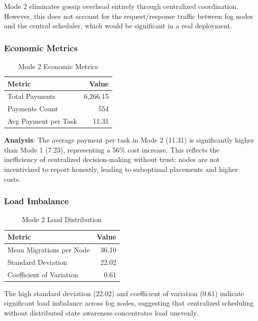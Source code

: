 \documentclass[12pt,a4paper]{article}
\begin{document}
Mode 2 eliminates gossip overhead entirely through centralized coordination. However, this does not account for the request/response traffic between fog nodes and the central scheduler, which would be significant in a real deployment.

\subsubsection{Economic Metrics}

\begin{table}[h]
\centering
\begin{tabular}{@{}lr@{}}
\toprule
\textbf{Metric} & \textbf{Value} \\ \midrule
Total Payments & 6,266.15 \\
Payments Count & 554 \\
Avg Payment per Task & 11.31 \\ \bottomrule
\end{tabular}
\caption{Mode 2 Economic Metrics}
\label{tab:mode2-economic}
\end{table}

\textbf{Analysis}: The average payment per task in Mode 2 (11.31) is significantly higher than Mode 1 (7.23), representing a 56\% cost increase. This reflects the inefficiency of centralized decision-making without trust: nodes are not incentivized to report honestly, leading to suboptimal placements and higher costs.

\subsubsection{Load Imbalance}

\begin{table}[h]
\centering
\begin{tabular}{@{}lr@{}}
\toprule
\textbf{Metric} & \textbf{Value} \\ \midrule
Mean Migrations per Node & 36.10 \\
Standard Deviation & 22.02 \\
Coefficient of Variation & 0.61 \\ \bottomrule
\end{tabular}
\caption{Mode 2 Load Distribution}
\label{tab:mode2-load}
\end{table}

The high standard deviation (22.02) and coefficient of variation (0.61) indicate significant load imbalance across fog nodes, suggesting that centralized scheduling without distributed state awareness concentrates load unevenly.
\end{document}

